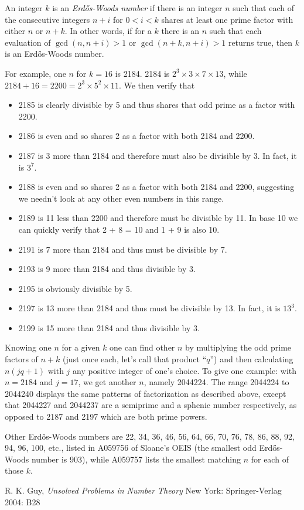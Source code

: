 \documentclass[12pt]{article}
\begin{document}
An integer $k$ is an {\em Erd\H{o}s-Woods number} if there is an integer $n$ such that each of the consecutive integers $n + i$ for $0 < i < k$ shares at least one prime factor with either $n$ or $n + k$. In other words, if for a $k$ there is an $n$ such that each evaluation of $\gcd(n, n + i) > 1$ or $\gcd(n + k, n + i) > 1$ returns true, then $k$ is an Erd\H{o}s-Woods number.

For example, one $n$ for $k = 16$ is 2184. 2184 is $2^3 \times 3 \times 7 \times 13$, while $2184 + 16 = 2200 = 2^3 \times 5^2 \times 11$. We then verify that

\begin{itemize}
\item 2185 is clearly divisible by 5 and thus shares that odd prime as a factor with 2200.
\item 2186 is even and so shares 2 as a factor with both 2184 and 2200.
\item 2187 is 3 more than 2184 and therefore must also be divisible by 3. In fact, it is $3^7$.
\item 2188 is even and so shares 2 as a factor with both 2184 and 2200, suggesting we needn't look at any other even numbers in this range.
\item 2189 is 11 less than 2200 and therefore must be divisible by 11. In base 10 we can quickly verify that 2 + 8 = 10 and 1 + 9 is also 10.
\item 2191 is 7 more than 2184 and thus must be divisible by 7.
\item 2193 is 9 more than 2184 and thus divisible by 3.
\item 2195 is obviously divisible by 5.
\item 2197 is 13 more than 2184 and thus must be divisible by 13. In fact, it is $13^3$.
\item 2199 is 15 more than 2184 and thus divisible by 3.
\end{itemize}

Knowing one $n$ for a given $k$ one can find other $n$ by multiplying the odd prime factors of $n + k$ (just once each, let's call that product ``$q$'') and then calculating $n(jq + 1)$ with $j$ any positive integer of one's choice. To give one example: with $n = 2184$ and $j =  17$, we get another $n$, namely 2044224. The range 2044224 to 2044240 displays the same patterns of factorization as described above, except that 2044227 and 2044237 are a semiprime and a sphenic number respectively, as opposed to 2187 and 2197 which are both prime powers.

Other Erd\H{o}s-Woods numbers are 22, 34, 36, 46, 56, 64, 66, 70, 76, 78, 86, 88, 92, 94, 96, 100, etc., listed in A059756 of Sloane's OEIS (the smallest odd Erd\H{o}s-Woods number is 903), while A059757 lists the smallest matching $n$ for each of those $k$.

\begin{thebibliography}{2}
 R. K. Guy, {\it Unsolved Problems in Number Theory} New York: Springer-Verlag 2004: B28
\end{thebibliography}
\end{document}
